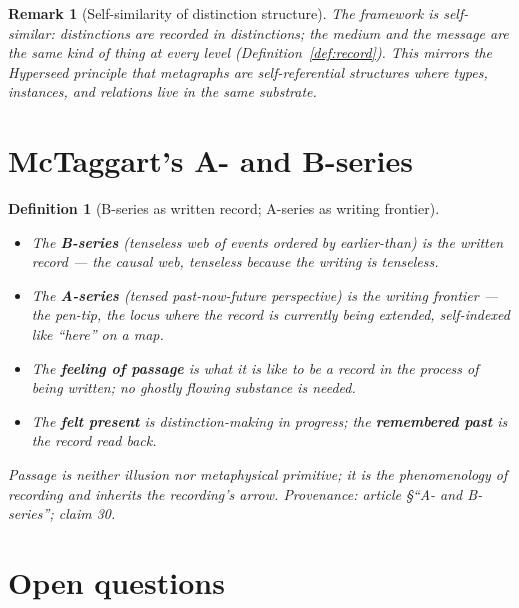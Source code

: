 \documentclass[11pt]{article}
\newtheorem{definition}{Definition}
\newtheorem{remark}{Remark}
\begin{document}
\begin{remark}[Self-similarity of distinction structure]
The framework is self-similar: distinctions are recorded in distinctions; the
medium and the message are the same kind of thing at every level
(Definition~\ref{def:record}).  This mirrors the Hyperseed principle that
metagraphs are self-referential structures where types, instances, and
relations live in the same substrate.
\end{remark}


\section{McTaggart's A- and B-series}

\begin{definition}[B-series as written record; A-series as writing frontier]
  \label{def:mctaggart}
\begin{itemize}
  \item The \textbf{B-series} (tenseless web of events ordered by
    earlier-than) is the written record — the causal web, tenseless because
    the writing is tenseless.
  \item The \textbf{A-series} (tensed past-now-future perspective) is the
    writing frontier — the pen-tip, the locus where the record is currently
    being extended, self-indexed like ``here'' on a map.
  \item The \textbf{feeling of passage} is what it is like to be a record in
    the process of being written; no ghostly flowing substance is needed.
  \item The \textbf{felt present} is distinction-making in progress; the
    \textbf{remembered past} is the record read back.
\end{itemize}
Passage is neither illusion nor metaphysical primitive; it is the
phenomenology of recording and inherits the recording's arrow.
\emph{Provenance: article \S``A- and B-series''; claim 30.}
\end{definition}


\section{Open questions}
\end{document}
